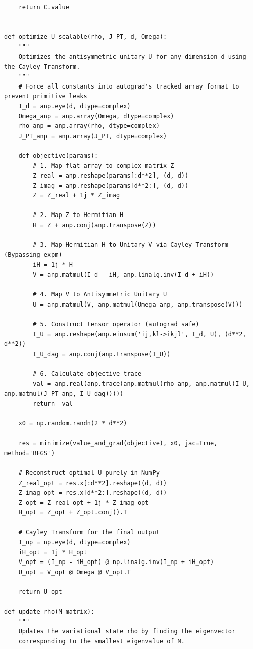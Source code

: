 \begin{lstlisting}
    return C.value


def optimize_U_scalable(rho, J_PT, d, Omega):
    """
    Optimizes the antisymmetric unitary U for any dimension d using the Cayley Transform.
    """
    # Force all constants into autograd's tracked array format to prevent primitive leaks
    I_d = anp.eye(d, dtype=complex)
    Omega_anp = anp.array(Omega, dtype=complex)
    rho_anp = anp.array(rho, dtype=complex)
    J_PT_anp = anp.array(J_PT, dtype=complex)
    
    def objective(params):
        # 1. Map flat array to complex matrix Z
        Z_real = anp.reshape(params[:d**2], (d, d))
        Z_imag = anp.reshape(params[d**2:], (d, d))
        Z = Z_real + 1j * Z_imag
        
        # 2. Map Z to Hermitian H
        H = Z + anp.conj(anp.transpose(Z))
        
        # 3. Map Hermitian H to Unitary V via Cayley Transform (Bypassing expm)
        iH = 1j * H
        V = anp.matmul(I_d - iH, anp.linalg.inv(I_d + iH))
        
        # 4. Map V to Antisymmetric Unitary U
        U = anp.matmul(V, anp.matmul(Omega_anp, anp.transpose(V)))
        
        # 5. Construct tensor operator (autograd safe)
        I_U = anp.reshape(anp.einsum('ij,kl->ikjl', I_d, U), (d**2, d**2))
        I_U_dag = anp.conj(anp.transpose(I_U))
        
        # 6. Calculate objective trace
        val = anp.real(anp.trace(anp.matmul(rho_anp, anp.matmul(I_U, anp.matmul(J_PT_anp, I_U_dag)))))
        return -val

    x0 = np.random.randn(2 * d**2)
    
    res = minimize(value_and_grad(objective), x0, jac=True, method='BFGS')
    
    # Reconstruct optimal U purely in NumPy
    Z_real_opt = res.x[:d**2].reshape((d, d))
    Z_imag_opt = res.x[d**2:].reshape((d, d))
    Z_opt = Z_real_opt + 1j * Z_imag_opt
    H_opt = Z_opt + Z_opt.conj().T
    
    # Cayley Transform for the final output
    I_np = np.eye(d, dtype=complex)
    iH_opt = 1j * H_opt
    V_opt = (I_np - iH_opt) @ np.linalg.inv(I_np + iH_opt)
    U_opt = V_opt @ Omega @ V_opt.T
    
    return U_opt

def update_rho(M_matrix):
    """
    Updates the variational state rho by finding the eigenvector 
    corresponding to the smallest eigenvalue of M.
    

\end{lstlisting}
